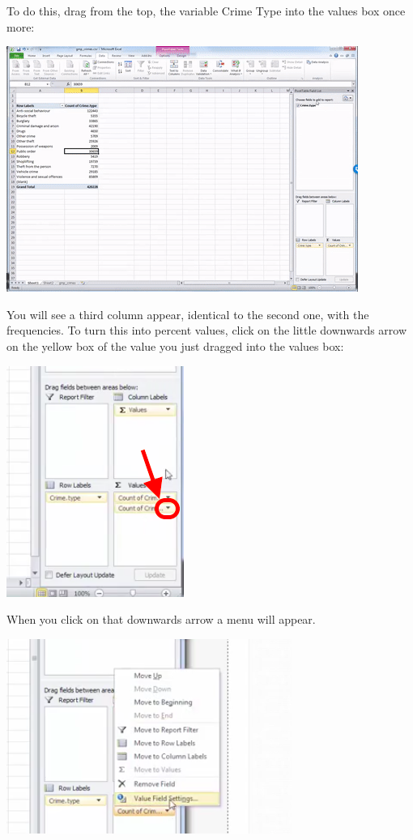 \documentclass[
]{book}
\begin{document}
To do this, drag from the top, the variable Crime Type into the values box once more:

\includegraphics{imgs/drag_perc_valu.gif}

You will see a third column appear, identical to the second one, with the frequencies. To turn this into percent values, click on the little downwards arrow on the yellow box of the value you just dragged into the values box:

\includegraphics{imgs/down_arrow_perc.png}

When you click on that downwards arrow a menu will appear.

\includegraphics{imgs/value_field_settings.png}
\end{document}
